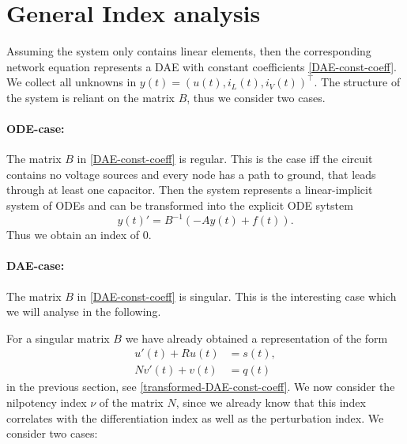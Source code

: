 \section{General Index analysis}

Assuming the system only contains linear elements, then the corresponding network equation represents a DAE with constant coefficients \eqref{DAE-const-coeff}. We collect all unknowns in $y(t)=(u(t), i_L(t), i_V(t))^\top$. The structure of the system is reliant on the matrix $B$, thus we consider two cases.

\paragraph{ODE-case:}
	The matrix $B$ in \eqref{DAE-const-coeff} is regular. This is the case iff the circuit contains no voltage sources and every node has a path to ground, that leads through at least one capacitor. Then the system represents a linear-implicit system of ODEs and can be transformed into the explicit ODE sytstem
	\begin{displaymath}
		y(t)'=B^{-1}(-Ay(t)+f(t)).
	\end{displaymath}
	Thus we obtain an index of $0$.
		
\paragraph{DAE-case:}
	The matrix $B$  in \eqref{DAE-const-coeff} is singular. This is the interesting case which we will analyse in the following.


For a singular matrix $B$ we have already obtained a representation of the form
\begin{align*}
	u'(t) + Ru(t) &= s(t), \\
	Nv'(t) + v(t) &= q(t)
\end{align*}
in the previous section, see \eqref{transformed-DAE-const-coeff}. We now consider the nilpotency index $\nu$ of the matrix $N$, since we already know that this index correlates with the differentiation index as well as the perturbation index. We consider two cases:

